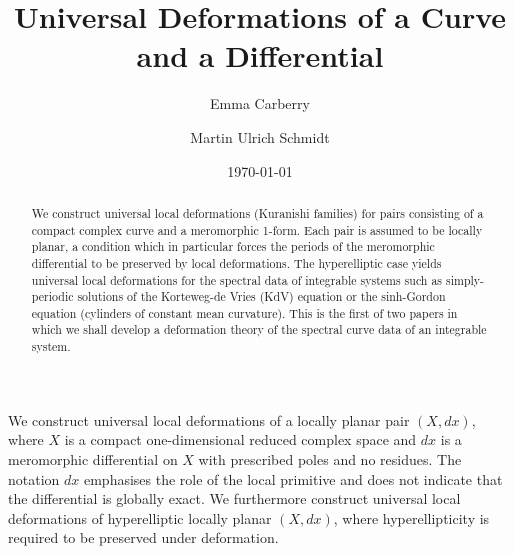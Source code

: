 \documentclass[11pt,twoside]{amsart}
\theoremstyle{plain}
\newcommand{\dfx}{dx}
\begin{document}
\title{Universal Deformations of a Curve and a Differential}
\author[E. Carberry]{Emma Carberry}
\address{School of Mathematics and Statistics\\University of Sydney\\Australia}
\author[M. Schmidt]{Martin Ulrich Schmidt}
\address{Mathematics Chair III\\
Universit\"at Mannheim\\
D-68131 Mannheim, Germany}

\begin{abstract}
We construct universal local deformations (Kuranishi families) for pairs consisting of a compact complex curve and a meromorphic 1-form. Each pair is assumed to be locally planar, a condition which in particular forces the periods of the meromorphic differential to be preserved by local deformations. The hyperelliptic case yields universal local deformations for the spectral data of integrable systems such as simply-periodic solutions of  the Korteweg-de Vries (KdV) equation or the sinh-Gordon equation (cylinders of constant mean curvature). %
This is the first of two papers in which we shall develop a deformation theory of the spectral curve data of an integrable system.
\end{abstract} 
\date{\today}
\maketitle
%
%
%
%
We construct universal local deformations of a locally planar pair $ (X,\dfx) $, where $ X $ is a compact one-dimensional reduced complex space and $\dfx $ is a meromorphic differential on $X$ with prescribed poles and no residues. The notation $\dfx $ emphasises the role of the local primitive and does not indicate that the differential is globally exact. We furthermore construct universal local deformations of hyperelliptic locally planar $ (X,\dfx) $, where hyperellipticity is required to be preserved under deformation.
\end{document}
